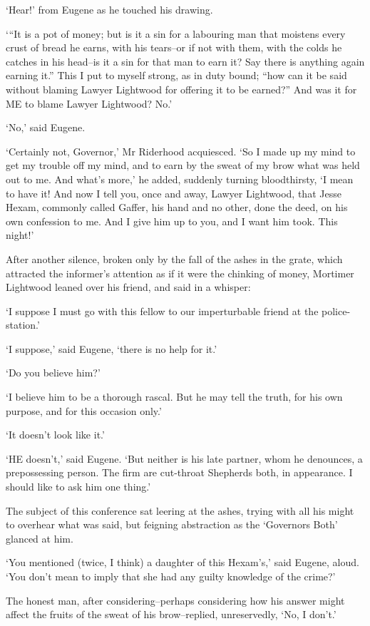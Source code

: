 ‘Hear!’ from Eugene as he touched his drawing.

‘“It is a pot of money; but is it a sin for a labouring man that
moistens every crust of bread he earns, with his tears--or if not with
them, with the colds he catches in his head--is it a sin for that man to
earn it? Say there is anything again earning it.” This I put to myself
strong, as in duty bound; “how can it be said without blaming Lawyer
Lightwood for offering it to be earned?” And was it for ME to blame
Lawyer Lightwood? No.’

‘No,’ said Eugene.

‘Certainly not, Governor,’ Mr Riderhood acquiesced. ‘So I made up my
mind to get my trouble off my mind, and to earn by the sweat of my brow
what was held out to me. And what’s more,’ he added, suddenly turning
bloodthirsty, ‘I mean to have it! And now I tell you, once and away,
Lawyer Lightwood, that Jesse Hexam, commonly called Gaffer, his hand and
no other, done the deed, on his own confession to me. And I give him up
to you, and I want him took. This night!’

After another silence, broken only by the fall of the ashes in the
grate, which attracted the informer’s attention as if it were the
chinking of money, Mortimer Lightwood leaned over his friend, and said
in a whisper:

‘I suppose I must go with this fellow to our imperturbable friend at the
police-station.’

‘I suppose,’ said Eugene, ‘there is no help for it.’

‘Do you believe him?’

‘I believe him to be a thorough rascal. But he may tell the truth, for
his own purpose, and for this occasion only.’

‘It doesn’t look like it.’

‘HE doesn’t,’ said Eugene. ‘But neither is his late partner, whom he
denounces, a prepossessing person. The firm are cut-throat Shepherds
both, in appearance. I should like to ask him one thing.’

The subject of this conference sat leering at the ashes, trying with
all his might to overhear what was said, but feigning abstraction as the
‘Governors Both’ glanced at him.

‘You mentioned (twice, I think) a daughter of this Hexam’s,’ said
Eugene, aloud. ‘You don’t mean to imply that she had any guilty
knowledge of the crime?’

The honest man, after considering--perhaps considering how his answer
might affect the fruits of the sweat of his brow--replied, unreservedly,
‘No, I don’t.’

